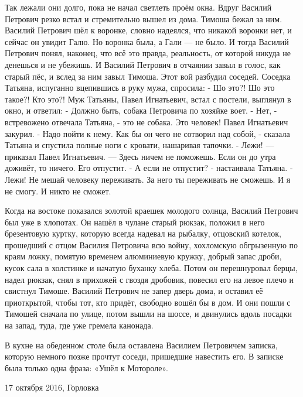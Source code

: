 Так лежали они долго, пока не начал светлеть проём окна. Вдруг Василий Петрович резко встал и стремительно вышел из дома. Тимоша бежал за ним. Василий Петрович шёл к воронке, словно надеялся, что никакой воронки нет, и сейчас он увидит Галю. Но воронка была, а Гали --- не было. И тогда Василий Петрович понял, наконец, что всё это правда, реальность, от которой никуда не денешься и не убежишь. И Василий Петрович в отчаянии завыл в голос, как старый пёс, и вслед за ним завыл Тимоша. Этот вой разбудил соседей. Соседка Татьяна, испуганно вцепившись в руку мужа, спросила:
- Шо это?! Шо это такое?! Кто это?!
Муж Татьяны, Павел Игнатьевич, встал с постели, выглянул в окно, и ответил:
- Должно быть, собака Петровича по хозяйке воет.
- Нет, - встревожено отвечала Татьяна, - это не собака. Это человек!
Павел Игнатьевич закурил.
- Надо пойти к нему. Как бы он чего не сотворил над собой, - сказала Татьяна и спустила полные ноги с кровати, нашаривая тапочки.
- Лежи! --- приказал Павел Игнатьевич. --- Здесь ничем не поможешь. Если он до утра доживёт, то ничего. Его отпустит.
- А если не отпустит? - настаивала Татьяна.
- Лежи! Не мешай человеку переживать. За него ты переживать не сможешь. И я не смогу. И никто не сможет.

Когда на востоке показался золотой краешек молодого солнца, Василий Петрович был уже в хлопотах. Он нашёл в чулане старый рюкзак, положил в него брезентовую куртку, которую всегда надевал на рыбалку, отцовский котелок, прошедший с отцом Василия Петровича всю войну, хохломскую обгрызенную по краям ложку, помятую временем алюминиевую кружку, добрый запас дроби, кусок сала в холстинке и начатую буханку хлеба. Потом он перешнуровал берцы, надел рюкзак, снял  в прихожей с гвоздя дробовик, повесил его на левое плечо и свистнул Тимоше.
Василий Петрович не запер дверь дома, и оставил её приоткрытой, чтобы тот, кто придёт, свободно вошёл бы в дом.
И они пошли с Тимошей сначала по улице, потом вышли на шоссе, и двинулись вдоль посадки на запад, туда,  где уже гремела канонада.

В кухне на обеденном столе была оставлена Василием Петровичем записка, которую немного позже прочтут соседи, пришедшие навестить его. В записке была только одна фраза:
«Ушёл к Мотороле».

17 октября 2016,
Горловка
